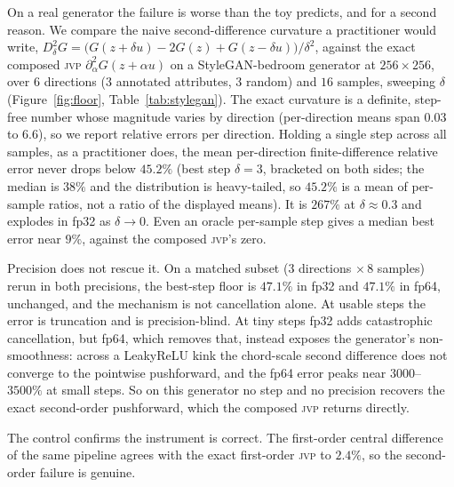 \documentclass[10pt]{article} %
\newcommand{\jvp}{\textsc{jvp}}
\begin{document}
On a real generator the failure is worse than the toy predicts, and for a second
reason. We compare the naive second-difference curvature a practitioner would
write, $D^2_\delta G=\big(G(z{+}\delta u)-2G(z)+G(z{-}\delta u)\big)/\delta^2$,
against the exact composed \jvp{} $\partial^2_\alpha G(z{+}\alpha u)$ on a
StyleGAN-bedroom generator at $256{\times}256$, over $6$ directions ($3$
annotated attributes, $3$ random) and $16$ samples, sweeping $\delta$
(Figure~\ref{fig:floor}, Table~\ref{tab:stylegan}). The exact curvature is a
definite, step-free number whose magnitude varies by direction (per-direction means
span $0.03$ to $6.6$), so we report relative errors per direction. Holding a single
step across all samples, as a practitioner does, the mean per-direction
finite-difference relative error never drops below $45.2\%$ (best step $\delta=3$,
bracketed on both sides; the median is $38\%$ and the distribution is heavy-tailed,
so $45.2\%$ is a mean of per-sample ratios, not a ratio of the displayed means). It
is $267\%$ at $\delta\!\approx\!0.3$ and explodes in fp32 as $\delta\to0$. Even an
oracle per-sample step gives a median best error near $9\%$, against the composed
\jvp's zero.

Precision does not rescue it. On a matched subset ($3$ directions $\times\,8$
samples) rerun in both precisions, the best-step floor is $47.1\%$ in fp32 and
$47.1\%$ in fp64, unchanged, and the mechanism is not cancellation alone. At usable
steps the error is truncation and is precision-blind. At tiny steps fp32 adds
catastrophic cancellation, but fp64, which removes that, instead exposes the
generator's non-smoothness: across a LeakyReLU kink the chord-scale second
difference does not converge to the pointwise pushforward, and the fp64 error peaks
near $3000$--$3500\%$ at small steps. So on this generator no step and no precision recovers the
exact second-order pushforward, which the composed \jvp{} returns directly.

The control confirms the instrument is correct. The first-order central difference
of the same pipeline agrees with the exact first-order \jvp{} to $2.4\%$, so the
second-order failure is genuine.
\end{document}
